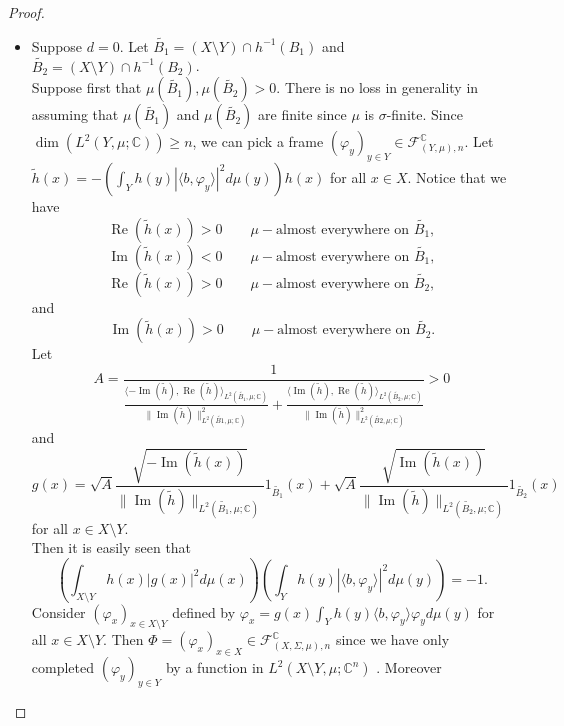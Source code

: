 \documentclass[a4paper,12pt]{article}
\theoremstyle{plain}
\theoremstyle{definition}
\theoremstyle{remark}
\begin{document}
\begin{proof}
\begin{itemize}
\item Suppose $d = 0$. Let $\widetilde{B_1} = (X \setminus Y) \cap h^{-1}(B_1)$ and $\widetilde{B_2} = (X \setminus Y) \cap h^{-1}(B_2)$. \\
Suppose first that $\mu(\widetilde{B_1}),\mu(\widetilde{B_2})>0$. There is no loss in generality in assuming that $\mu(\widetilde{B_1})$ and $\mu(\widetilde{B_2})$ are finite since $\mu$ is $\sigma$-finite.  Since $\dim(L^2(Y,\mu;\mathbb{C})) \geq n$, we can pick a frame $(\varphi_y)_{y \in Y} \in \mathcal{F}_{(Y,\mu),n}^\mathbb{C}$. Let $\widetilde{h}(x) = - \left( \int_Y h(y) |\langle b , \varphi_y \rangle|^2 d\mu(y) \right) h(x)$ for all $x \in X$. Notice that we have 
\[ \operatorname{Re}(\widetilde{h}(x)) > 0 \qquad \mu-\text{almost everywhere on } \widetilde{B_1}, \] 
\[ \operatorname{Im}(\widetilde{h}(x)) < 0 \qquad \mu-\text{almost everywhere on } \widetilde{B_1}, \]
\[ \operatorname{Re}(\widetilde{h}(x)) > 0 \qquad \mu-\text{almost everywhere on } \widetilde{B_2}, \]  
and 
\[ \operatorname{Im}(\widetilde{h}(x)) > 0 \qquad \mu-\text{almost everywhere on } \widetilde{B_2}. \] 
Let 
\[ A = \frac{1}{\frac{\langle - \operatorname{Im}(\tilde{h}), \operatorname{Re}(\tilde{h}) \rangle_{L^2(\tilde{B_1},\mu;\mathbb{C})}}{\lVert \operatorname{Im}(\tilde{h}) \rVert_{L^2(\tilde{B1},\mu;\mathbb{C})}^2} + \frac{\langle \operatorname{Im}(\tilde{h}), \operatorname{Re}(\tilde{h}) \rangle_{L^2(\tilde{B_2},\mu;\mathbb{C})}}{\lVert \operatorname{Im}(\tilde{h}) \rVert_{L^2(\tilde{B2},\mu;\mathbb{C})}^2}} > 0 \]
and 
\[ g(x) = \sqrt{A} \frac{\sqrt{-\operatorname{Im}(\widetilde{h}(x))}}{\lVert \operatorname{Im}(\widetilde{h}) \rVert_{L^2(\widetilde{B_1},\mu;\mathbb{C})}} 1_{\widetilde{B_1}}(x) + \sqrt{A} \frac{\sqrt{\operatorname{Im}(\widetilde{h}(x))}}{\lVert \operatorname{Im}(\widetilde{h}) \rVert_{L^2(\widetilde{B_2},\mu;\mathbb{C})}} 1_{\widetilde{B_2}}(x) \]
for all $x \in X \setminus Y$. \\
Then it is easily seen that 
\begin{equation}
\label{eq2}
\left( \int_{X \setminus Y} h(x) |g(x)|^2  d\mu(x) \right) \left(\int_Y h(y) | \langle b , \varphi_y \rangle | ^2 d\mu(y) \right) = -1. 
\end{equation}
Consider $(\varphi_x)_{x \in X \setminus Y}$ defined by $\varphi_x = g(x)\int_Y h(y) \langle b , \varphi_y \rangle \varphi_y d\mu(y)$ for all $x \in X \setminus Y$. Then $\Phi = (\varphi_x)_{x \in X} \in \mathcal{F}_{(X,\Sigma,\mu),n}^\mathbb{C}$ since we have only completed $(\varphi_y)_{y \in Y}$ by a function in $L^2(X \setminus Y,\mu;\mathbb{C}^n)$ . Moreover

\end{itemize}
\end{proof}
\end{document}
